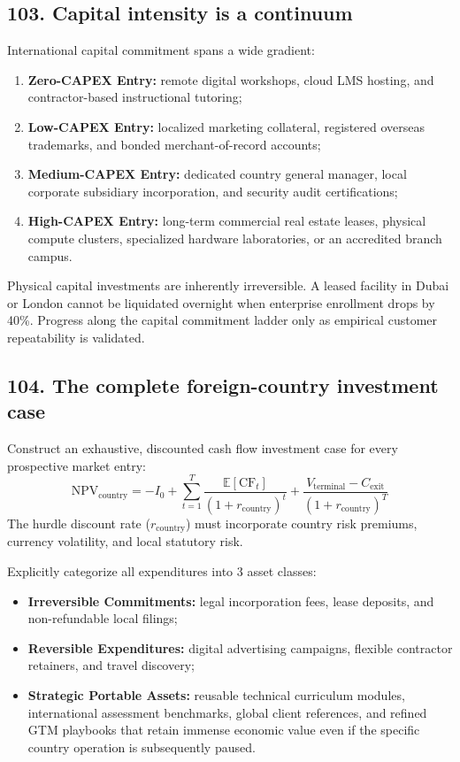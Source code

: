 \subsection{103. Capital intensity is a continuum}

International capital commitment spans a wide gradient:
\begin{enumerate}
    \item \textbf{Zero-CAPEX Entry:} remote digital workshops, cloud LMS hosting, and contractor-based instructional tutoring;
    \item \textbf{Low-CAPEX Entry:} localized marketing collateral, registered overseas trademarks, and bonded merchant-of-record accounts;
    \item \textbf{Medium-CAPEX Entry:} dedicated country general manager, local corporate subsidiary incorporation, and security audit certifications;
    \item \textbf{High-CAPEX Entry:} long-term commercial real estate leases, physical compute clusters, specialized hardware laboratories, or an accredited branch campus.
\end{enumerate}
Physical capital investments are inherently irreversible. A leased facility in Dubai or London cannot be liquidated overnight when enterprise enrollment drops by 40\%. Progress along the capital commitment ladder only as empirical customer repeatability is validated.

\subsection{104. The complete foreign-country investment case}

Construct an exhaustive, discounted cash flow investment case for every prospective market entry:
\begin{equation}
\text{NPV}_{\text{country}} = -I_0 + \sum_{t=1}^{T} \frac{\mathbb{E}\left[\text{CF}_t\right]}{(1 + r_{\text{country}})^t} + \frac{V_{\text{terminal}} - C_{\text{exit}}}{(1 + r_{\text{country}})^T}
\end{equation}
The hurdle discount rate ($r_{\text{country}}$) must incorporate country risk premiums, currency volatility, and local statutory risk.

Explicitly categorize all expenditures into 3 asset classes:
\begin{itemize}
    \item \textbf{Irreversible Commitments:} legal incorporation fees, lease deposits, and non-refundable local filings;
    \item \textbf{Reversible Expenditures:} digital advertising campaigns, flexible contractor retainers, and travel discovery;
    \item \textbf{Strategic Portable Assets:} reusable technical curriculum modules, international assessment benchmarks, global client references, and refined GTM playbooks that retain immense economic value even if the specific country operation is subsequently paused.
\end{itemize}

